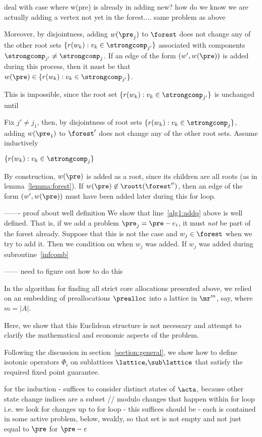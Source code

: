 deal with case where w(pre) is already in 
adding new? 
how do we know we are actually adding a vertex not yet in the forest....
same problem as above

Moreover, by disjointness, adding $w(\pre_j)$ to $\forest$ does not change any of the other root sets $\{r(w_k): v_k \in \strongcomp_{j'}\}$ associated with components $\strongcomp_{j'} \not = \strongcomp_j$. 
If an edge of the form $(w',w(\pre))$ is added during this process, then it must be that $w(\pre) \in \{r(w_k): v_k \in \strongcomp_{j'}\}$. 

This is impossible, since the root set $\{r(w_k): v_k \in \strongcomp_{j'}\}$ is unchanged until 

Fix $j' \not = j_1$, then, by disjointness of root sets $\{r(w_k): v_k \in \strongcomp_j\}$, adding $w(\pre_1)$ to $\forest'$ does not change any of the other root sets. 
Assume inductively 

$\{r(w_k): v_k \in \strongcomp_j\}$

By construction, $w(\pre)$ is added as a root, since its children are all roots (as in lemma~\ref{lemma:forest}). 
If $w(\pre) \not \in \roott(\forest'')$, then an edge of the form $(w',w(\pre))$ must have been added later during this for loop.  


------- proof about well definition 
We show that line~\ref{alg1:addq} above is well defined. 
That is, if we add a problem $\pre_j = \pre - e_i$, it must \emph{not} be part of the forest already. 
Suppose that this is not the case and $w_j \in \forest$ when we try to add it.
Then we condition on when $w_j$ was added. 
If $w_j$ was added during subroutine~\ref{infcomb}


------ need to figure out how to do this



In the algorithm for finding all strict core allocations presented above, we relied on an embedding of preallocations $\prealloc$ into a lattice in $\mr^m$, say, where $m = |A|$.

Here, we show that this Euclidean structure is not necessary and attempt to clarify the mathematical and economic aspects of the problem.

Following the discussion in section~\ref{section:general}, we show how to define isotonic operators $\Phi_i$ on sublattices $\lattice_i \sub \lattice$ that satisfy the required fixed point guarantee. 

for the induction - suffices to consider distinct states of $\acta$, because other state change indices are a subset // modulo changes that happen within for loop i.e. we look for changes up to for loop - this suffices
    should be - each is contained in some active problem, below, weakly, so that set is not empty and not just equal to $\pre$ for $\pre - e$

